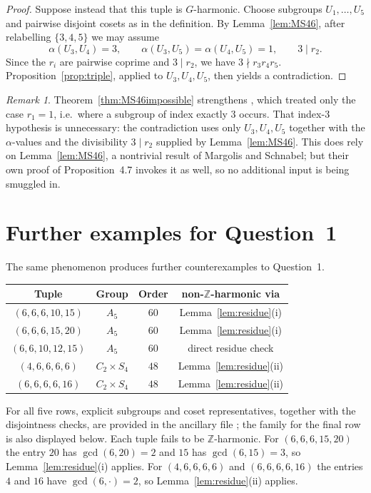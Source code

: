 \documentclass[12pt]{article}
\theoremstyle{remark}
\newtheorem{remark}[theorem]{Remark}
\newcommand{\Z}{\mathbb{Z}}
\begin{document}
\begin{proof}
Suppose instead that this tuple is $G$-harmonic. Choose subgroups $U_1,\ldots,U_5$ and pairwise disjoint cosets as in the definition. By Lemma~\ref{lem:MS46}, after relabelling $\{3,4,5\}$ we may assume
\[
\alpha(U_3,U_4)=3,\qquad \alpha(U_3,U_5)=\alpha(U_4,U_5)=1,\qquad 3\mid r_2 .
\]
Since the $r_i$ are pairwise coprime and $3\mid r_2$, we have $3\nmid r_3r_4r_5$. Proposition~\ref{prop:triple}, applied to $U_3,U_4,U_5$, then yields a contradiction.
\end{proof}

\begin{remark}
Theorem~\ref{thm:MS46impossible} strengthens \cite[Proposition~4.7]{MargolisSchnabel}, which treated only the case $r_1=1$, i.e.\ where a subgroup of index exactly $3$ occurs. That index-$3$ hypothesis is unnecessary: the contradiction uses only $U_3,U_4,U_5$ together with the $\alpha$-values and the divisibility $3\mid r_2$ supplied by Lemma~\ref{lem:MS46}. This does rely on Lemma~\ref{lem:MS46}, a nontrivial result of Margolis and Schnabel; but their own proof of Proposition~4.7 invokes it as well, so no additional input is being smuggled in.
\end{remark}

\section{Further examples for Question~1}

The same phenomenon produces further counterexamples to Question~1.

\begin{center}
\begin{tabular}{|c|c|c|c|}
\hline
Tuple & Group & Order & non-$\Z$-harmonic via\\
\hline
$(6,6,6,10,15)$ & $A_5$ & $60$ & Lemma~\ref{lem:residue}(i)\\
$(6,6,6,15,20)$ & $A_5$ & $60$ & Lemma~\ref{lem:residue}(i)\\
$(6,6,10,12,15)$ & $A_5$ & $60$ & direct residue check\\
$(4,6,6,6,6)$ & $C_2 \times S_4$ & $48$ & Lemma~\ref{lem:residue}(ii)\\
$(6,6,6,6,16)$ & $C_2 \times S_4$ & $48$ & Lemma~\ref{lem:residue}(ii)\\
\hline
\end{tabular}
\end{center}

For all five rows, explicit subgroups and coset representatives, together with the disjointness checks, are provided in the ancillary file ; the family for the final row is also displayed below. Each tuple fails to be $\Z$-harmonic. For $(6,6,6,15,20)$ the entry $20$ has $\gcd(6,20)=2$ and $15$ has $\gcd(6,15)=3$, so Lemma~\ref{lem:residue}(i) applies. For $(4,6,6,6,6)$ and $(6,6,6,6,16)$ the entries $4$ and $16$ have $\gcd(6,\cdot)=2$, so Lemma~\ref{lem:residue}(ii) applies.
\end{document}
